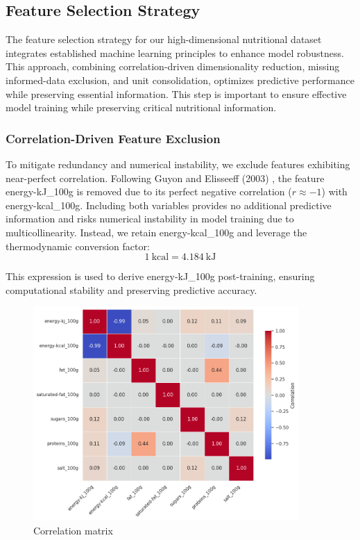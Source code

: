 \subsection{Feature Selection Strategy}
The feature selection strategy for our high-dimensional nutritional dataset integrates established machine learning principles to enhance model robustness. This approach, combining correlation-driven dimensionality reduction, missing  informed-data exclusion, and unit consolidation, optimizes predictive performance while preserving essential information. This step is important to ensure effective model training while preserving critical nutritional information.

\subsubsection{Correlation-Driven Feature Exclusion}
To mitigate redundancy and numerical instability, we exclude features exhibiting near-perfect correlation. Following Guyon and Elisseeff (2003) \cite{guyon2003}, the feature energy-kJ\_100g is removed due to its perfect negative correlation ($r \approx -1$) with energy-kcal\_100g. Including both variables provides no additional predictive information and risks numerical instability in model training due to multicollinearity. Instead, we retain energy-kcal\_100g and leverage the thermodynamic conversion factor:
$$1~\mathrm{kcal} = 4.184~\mathrm{kJ}$$


This expression is used to derive energy-kJ\_100g post-training, ensuring computational stability and preserving predictive accuracy.

\begin{center}
\begin{figure}[H]
    \includegraphics[width=0.9\textwidth]{images/correlation_matrix.png}
    \caption{Correlation matrix} 
    \label{fig:Correlation_matrix}
\end{figure}
\end{center}


